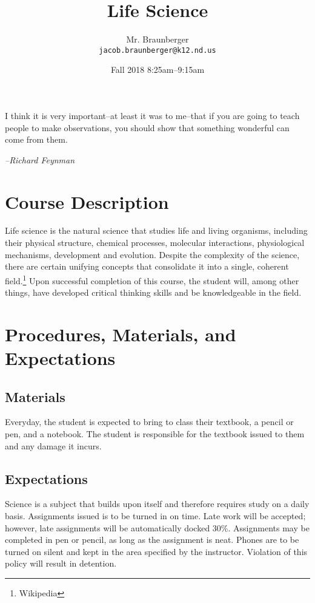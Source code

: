 \documentclass[11pt,article,oneside]{memoir}
\begin{document}
\title{\LARGE Life Science}
\author{\Large Mr. Braunberger \newline \\ \footnotesize\texttt{\noindent jacob.braunberger@k12.nd.us}}
\date{\hspace*{2.3cm}Fall 2018 \newline \noindent \hspace*{-1.5cm} 8:25am--9:15am}

\setlength{\epigraphwidth}{.8\textwidth}

\maketitle

\epigraph{I think it is very important--at least it was to me--that if you are going to teach people to make observations, you should show that something wonderful can come from them.}{\textit{--Richard Feynman}}




\section*{Course Description}
Life science is the natural science that studies life and living organisms, including their physical structure, chemical processes, molecular interactions, physiological mechanisms, development and evolution. Despite the complexity of the science, there are certain unifying concepts that consolidate it into a single, coherent field.\footnote{Wikipedia} Upon successful completion of this course, the student will, among other things, have
developed critical thinking skills and be knowledgeable in the field.


\section*{Procedures, Materials, and Expectations}
\subsection*{Materials}
	Everyday, the student is expected to bring to class their textbook, a pencil or pen, and a notebook. The student is responsible
for the textbook issued to them and any damage it incurs.
\subsection*{Expectations}
	Science is a subject that builds upon itself and therefore requires study on a daily basis.
    Assignments issued is to be turned in on time. Late work will be accepted; however,
late assignments will be automatically docked 30\%. Assignments may be completed in pen or pencil, as long as the assignment is neat.
Phones are to be turned on silent and kept in the area specified by the instructor. Violation of this policy will result in detention.
\end{document}
